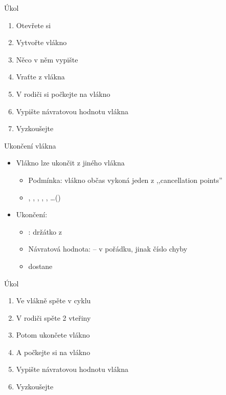 \begin{frame}{Úkol}

  \begin{enumerate}
    \item Otevřete si \ifpcdirlinux {} \else
        \fi
    \item Vytvořte vlákno
    \item Něco v něm vypište
    \item Vraťte z vlákna 
    \item V rodiči si počkejte na vlákno
    \item Vypište návratovou hodnotu vlákna
    \item Vyzkoušejte
  \end{enumerate}

\end{frame}

\begin{frame}{Ukončení vlákna}

  \begin{itemize}
    \item Vlákno lze ukončit z jiného vlákna
    \begin{itemize}
      \item Podmínka: vlákno občas vykoná jeden z ,,cancellation points''
      \item {}, , , , ,
        \dots ()
    \end{itemize}

    \pause

    \item Ukončení: 
    \begin{itemize}
      \item {}: držátko z 
      \item Návratová hodnota:  -- v pořádku, jinak číslo chyby
      \item {} dostane 
    \end{itemize}
  \end{itemize}

\end{frame}

\begin{frame}{Úkol}

  \begin{enumerate}
    \item Ve vlákně spěte v cyklu
    \item V rodiči spěte 2 vteřiny
    \item Potom ukončete vlákno
    \item A počkejte si na vlákno
    \item Vypište návratovou hodnotu vlákna
    \item Vyzkoušejte
  \end{enumerate}

\end{frame}
